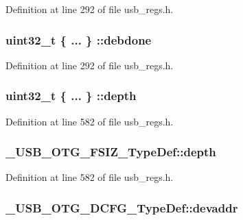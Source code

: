 Definition at line 292 of file usb\-\_\-regs.\-h.

\hypertarget{group___u_s_b___o_t_g___d_r_i_v_e_r_ga9fe8643736470da64da884d5dc5f1a2a}{
\subsubsection[{debdone}]{\setlength{\rightskip}{0pt plus 5cm}uint32\-\_\-t \{ ... \} \-::debdone}}\label{group___u_s_b___o_t_g___d_r_i_v_e_r_ga9fe8643736470da64da884d5dc5f1a2a}


Definition at line 292 of file usb\-\_\-regs.\-h.

\hypertarget{group___u_s_b___o_t_g___d_r_i_v_e_r_ga108978b1b56e006f1adbef4323f7ae3c}{
\subsubsection[{depth}]{\setlength{\rightskip}{0pt plus 5cm}uint32\-\_\-t \{ ... \} \-::depth}}\label{group___u_s_b___o_t_g___d_r_i_v_e_r_ga108978b1b56e006f1adbef4323f7ae3c}


Definition at line 582 of file usb\-\_\-regs.\-h.

\hypertarget{group___u_s_b___o_t_g___d_r_i_v_e_r_gaecd6fc1354e12e8da341d975571922c5}{
\subsubsection[{depth}]{ \-\_\-\-U\-S\-B\-\_\-\-O\-T\-G\-\_\-\-F\-S\-I\-Z\-\_\-\-Type\-Def\-::depth}}\label{group___u_s_b___o_t_g___d_r_i_v_e_r_gaecd6fc1354e12e8da341d975571922c5}


Definition at line 582 of file usb\-\_\-regs.\-h.

\hypertarget{group___u_s_b___o_t_g___d_r_i_v_e_r_ga480afca18ff15a505a2aacace2f86879}{
\subsubsection[{devaddr}]{ \-\_\-\-U\-S\-B\-\_\-\-O\-T\-G\-\_\-\-D\-C\-F\-G\-\_\-\-Type\-Def\-::devaddr}}\label{group___u_s_b___o_t_g___d_r_i_v_e_r_ga480afca18ff15a505a2aacace2f86879}


